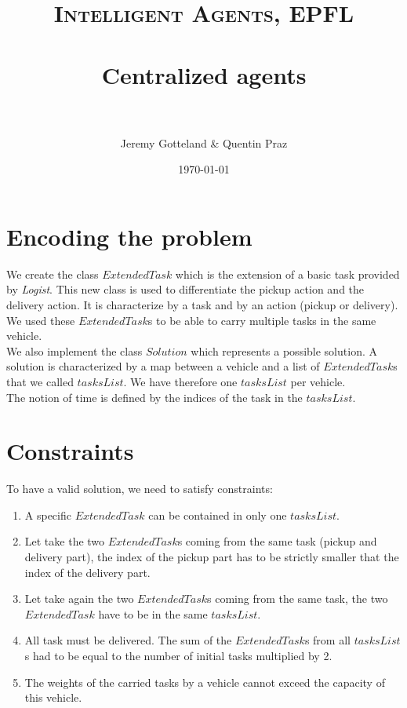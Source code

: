 \documentclass[fontsize=12pt]{scrartcl} %
\title{	
\normalfont \normalsize 
\textsc{Intelligent Agents, EPFL} \\ [20pt] %
\horrule{0.5pt} \\[0.4cm] %
\huge Centralized agents \\ %
\horrule{2pt} \\[0.5cm] %
}
\author{Jeremy Gotteland \& Quentin Praz} %
\date{\normalsize\today} %
\begin{document}
\maketitle %


\section*{Encoding the problem}
We create the class $ExtendedTask$ which is the extension of a basic task provided by \textit{Logist}. This new class is used to differentiate the pickup action and the delivery action. It is characterize by a task and by an action (pickup or delivery). We used these $ExtendedTask$s to be able to carry multiple tasks in the same vehicle.\\
We also implement the class $Solution$ which represents a possible solution. A solution is characterized by a map between a vehicle and a list of $ExtendedTask$s that we called $tasksList$. We have therefore one $tasksList$ per vehicle.\\
The notion of time is defined by the indices of the task in the $tasksList$.

\section*{Constraints}
To have a valid solution, we need to satisfy constraints:
\begin{enumerate}
\item A specific $ExtendedTask$ can be contained in only one $tasksList$.
\item Let take the two $ExtendedTask$s coming from the same task (pickup and delivery part), the index of the pickup part has to be strictly smaller that the index of the delivery part.
\item Let take again the two $ExtendedTask$s coming from the same task, the two $ExtendedTask$ have to be in the same $tasksList$.
\item All task must be delivered. The sum of the $ExtendedTask$s from all $tasksList$s had to be equal to the number of initial tasks multiplied by 2.
\item The weights of the carried tasks by a vehicle cannot exceed the capacity of this vehicle. 
\end{enumerate}
\end{document}
